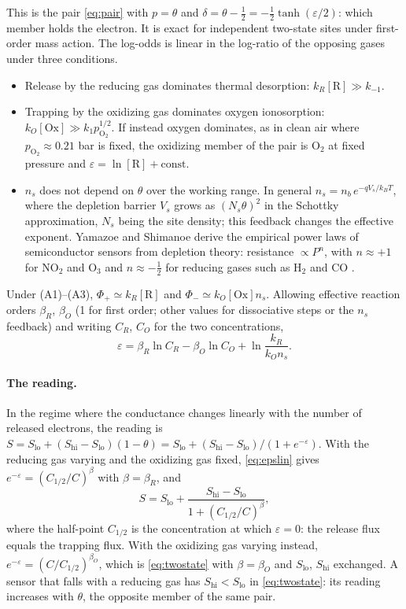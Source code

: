 \documentclass[11pt]{article}
\theoremstyle{definition}\newtheorem{definition}[theorem]{Definition}
\theoremstyle{remark}\newtheorem{remark}[theorem]{Remark}
\begin{document}
This is the pair \eqref{eq:pair} with $p=\theta$ and $\delta=\theta-\frac12=-\frac12\tanh(\varepsilon/2)$: which member holds the electron. It is exact for independent two-state sites under first-order mass action. The log-odds is linear in the log-ratio of the opposing gases under three conditions.
\begin{itemize}
\item[(A1)] Release by the reducing gas dominates thermal desorption: $k_R[\mathrm R]\gg k_{-1}$.
\item[(A2)] Trapping by the oxidizing gas dominates oxygen ionosorption: $k_O[\mathrm{Ox}]\gg k_1p_{\mathrm{O_2}}^{1/2}$. If instead oxygen dominates, as in clean air where $p_{\mathrm{O_2}}\approx0.21$ bar is fixed, the oxidizing member of the pair is O$_2$ at fixed pressure and $\varepsilon=\ln[\mathrm R]+\mathrm{const}$.
\item[(A3)] $n_s$ does not depend on $\theta$ over the working range. In general $n_s=n_b\,e^{-qV_s/k_BT}$, where the depletion barrier $V_s$ grows as $(N_s\theta)^2$ in the Schottky approximation, $N_s$ being the site density; this feedback changes the effective exponent. Yamazoe and Shimanoe derive the empirical power laws of semiconductor sensors from depletion theory: resistance $\propto P^n$, with $n\approx+1$ for NO$_2$ and O$_3$ and $n\approx-\frac12$ for reducing gases such as H$_2$ and CO \cite{YamazoeShimanoe}.
\end{itemize}
Under (A1)--(A3), $\Phi_+\simeq k_R[\mathrm R]$ and $\Phi_-\simeq k_O[\mathrm{Ox}]n_s$. Allowing effective reaction orders $\beta_R$, $\beta_O$ (1 for first order; other values for dissociative steps or the $n_s$ feedback) and writing $C_R$, $C_O$ for the two concentrations,
\begin{equation}\label{eq:epslin}
\varepsilon=\beta_R\ln C_R-\beta_O\ln C_O+\ln\frac{k_R}{k_On_s}.
\end{equation}

\paragraph{The reading.} In the regime where the conductance changes linearly with the number of released electrons, the reading is $S=S_\mathrm{lo}+(S_\mathrm{hi}-S_\mathrm{lo})(1-\theta)=S_\mathrm{lo}+(S_\mathrm{hi}-S_\mathrm{lo})/(1+e^{-\varepsilon})$. With the reducing gas varying and the oxidizing gas fixed, \eqref{eq:epslin} gives $e^{-\varepsilon}=(C_{1/2}/C)^{\beta}$ with $\beta=\beta_R$, and
\begin{equation}\label{eq:twostate}
S=S_\mathrm{lo}+\frac{S_\mathrm{hi}-S_\mathrm{lo}}{1+(C_{1/2}/C)^{\beta}},
\end{equation}
where the half-point $C_{1/2}$ is the concentration at which $\varepsilon=0$: the release flux equals the trapping flux. With the oxidizing gas varying instead, $e^{-\varepsilon}=(C/C_{1/2})^{\beta_O}$, which is \eqref{eq:twostate} with $\beta=\beta_O$ and $S_\mathrm{lo}$, $S_\mathrm{hi}$ exchanged. A sensor that falls with a reducing gas has $S_\mathrm{hi}<S_\mathrm{lo}$ in \eqref{eq:twostate}: its reading increases with $\theta$, the opposite member of the same pair.
\end{document}

